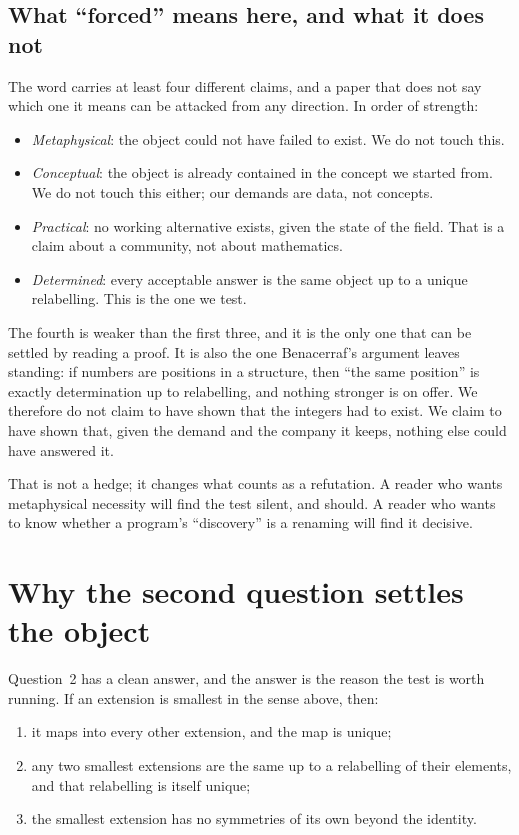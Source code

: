 \documentclass[aps,prd,preprint,superscriptaddress,amsmath,amssymb]{revtex4-2}
\begin{document}
\subsection*{What ``forced'' means here, and what it does not}

The word carries at least four different claims, and a paper that does not say
which one it means can be attacked from any direction.  In order of strength:

\begin{itemize}
\item \emph{Metaphysical}: the object could not have failed to exist.  We do not
      touch this.
\item \emph{Conceptual}: the object is already contained in the concept we
      started from.  We do not touch this either; our demands are data, not
      concepts.
\item \emph{Practical}: no working alternative exists, given the state of the
      field.  That is a claim about a community, not about mathematics.
\item \emph{Determined}: every acceptable answer is the same object up to a
      unique relabelling.  This is the one we test.
\end{itemize}

The fourth is weaker than the first three, and it is the only one that can be
settled by reading a proof.  It is also the one Benacerraf's argument leaves
standing: if numbers are positions in a structure, then ``the same position'' is
exactly determination up to relabelling, and nothing stronger is on offer.  We
therefore do not claim to have shown that the integers had to exist.  We claim to
have shown that, given the demand and the company it keeps, nothing else could
have answered it.

That is not a hedge; it changes what counts as a refutation.  A reader who wants
metaphysical necessity will find the test silent, and should.  A reader who wants
to know whether a program's ``discovery'' is a renaming will find it decisive.

\section{Why the second question settles the object}
\label{sec:theorem}

Question~2 has a clean answer, and the answer is the reason the test is worth
running.  If an extension is smallest in the sense above, then:

\begin{enumerate}
\item it maps into every other extension, and the map is unique;
\item any two smallest extensions are the same up to a relabelling of their
      elements, and that relabelling is itself unique;
\item the smallest extension has no symmetries of its own beyond the identity.
\end{enumerate}
\end{document}
